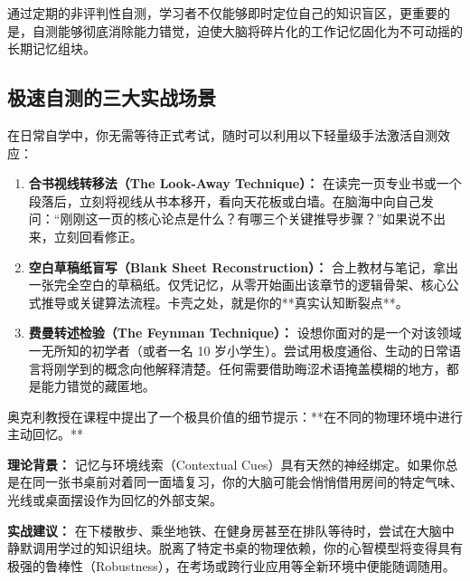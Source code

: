 \documentclass[12pt,a4paper,openany]{ctexbook}
\begin{document}
\begin{keypoint}
通过定期的非评判性自测，学习者不仅能够即时定位自己的知识盲区，更重要的是，自测能够彻底消除能力错觉，迫使大脑将碎片化的工作记忆固化为不可动摇的长期记忆组块。
\end{keypoint}

\subsection*{极速自测的三大实战场景}

在日常自学中，你无需等待正式考试，随时可以利用以下轻量级手法激活自测效应：

\begin{practicebox}[即时主动回忆的标准操作法]
\begin{enumerate}
    \item \textbf{合书视线转移法（The Look-Away Technique）：}
    在读完一页专业书或一个段落后，立刻将视线从书本移开，看向天花板或白墙。在脑海中向自己发问：“刚刚这一页的核心论点是什么？有哪三个关键推导步骤？”如果说不出来，立刻回看修正。
    
    \item \textbf{空白草稿纸盲写（Blank Sheet Reconstruction）：}
    合上教材与笔记，拿出一张完全空白的草稿纸。仅凭记忆，从零开始画出该章节的逻辑骨架、核心公式推导或关键算法流程。卡壳之处，就是你的**真实认知断裂点**。
    
    \item \textbf{费曼转述检验（The Feynman Technique）：}
    设想你面对的是一个对该领域一无所知的初学者（或者一名 10 岁小学生）。尝试用极度通俗、生动的日常语言将刚学到的概念向他解释清楚。任何需要借助晦涩术语掩盖模糊的地方，都是能力错觉的藏匿地。
\end{enumerate}
\end{practicebox}

\begin{extensionbox}[更换物理环境进行回忆练习]
奥克利教授在课程中提出了一个极具价值的细节提示：**在不同的物理环境中进行主动回忆。**

\textbf{理论背景：} 记忆与环境线索（Contextual Cues）具有天然的神经绑定。如果你总是在同一张书桌前对着同一面墙复习，你的大脑可能会悄悄借用房间的特定气味、光线或桌面摆设作为回忆的外部支架。

\textbf{实战建议：} 在下楼散步、乘坐地铁、在健身房甚至在排队等待时，尝试在大脑中静默调用学过的知识组块。脱离了特定书桌的物理依赖，你的心智模型将变得具有极强的鲁棒性（Robustness），在考场或跨行业应用等全新环境中便能随调随用。
\end{extensionbox}
\end{document}
